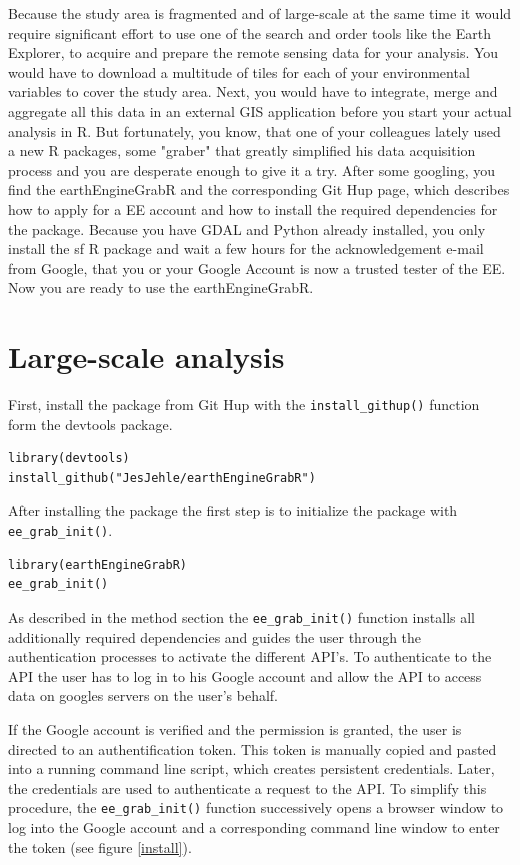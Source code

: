 Because the study area is fragmented and of large-scale at the same time it would require significant effort to use one of the search and order tools like the Earth Explorer, to acquire and prepare the remote sensing data for your analysis. You would have to download a multitude of tiles for each of your environmental variables to cover the study area. Next, you would have to integrate, merge and aggregate all this data in an external GIS application before you start your actual analysis in R. But fortunately, you know, that one of your colleagues lately used a new R packages, some "graber" that greatly simplified his data acquisition process and you are desperate enough to give it a try. After some googling, you find the earthEngineGrabR and the corresponding Git Hup page, which describes how to apply for a EE account and how to install the required dependencies for the package. Because you have GDAL and Python already installed, you only install the sf R package and wait a few hours for the acknowledgement e-mail from Google, that you or your Google Account is now a trusted tester of the EE. Now you are ready to use the earthEngineGrabR.

\section{Large-scale analysis}

First, install the package from Git Hup with the \texttt{install\_githup()} function form the devtools package.

\begin{lstlisting}
library(devtools)
install_github("JesJehle/earthEngineGrabR")
\end{lstlisting}

After installing the package the first step is to initialize the package with \texttt{ee\_grab\_init()}. 

\begin{lstlisting}
library(earthEngineGrabR)
ee_grab_init()
\end{lstlisting}

As described in the method section the \texttt{ee\_grab\_init()} function installs all additionally required dependencies and guides the user through the authentication processes to activate the different API's. To authenticate to the API the user has to log in to his Google account and allow the API to access data on googles servers on the user's behalf. 


If the Google account is verified and the permission is granted, the user is directed to an authentification token. This token is manually copied and pasted into a running command line script, which creates persistent credentials. Later, the credentials are used to authenticate a request to the API. To simplify this procedure, the \texttt{ee\_grab\_init()} function successively opens a browser window to log into the Google account and a corresponding command line window to enter the token (see figure \ref{install}). 

